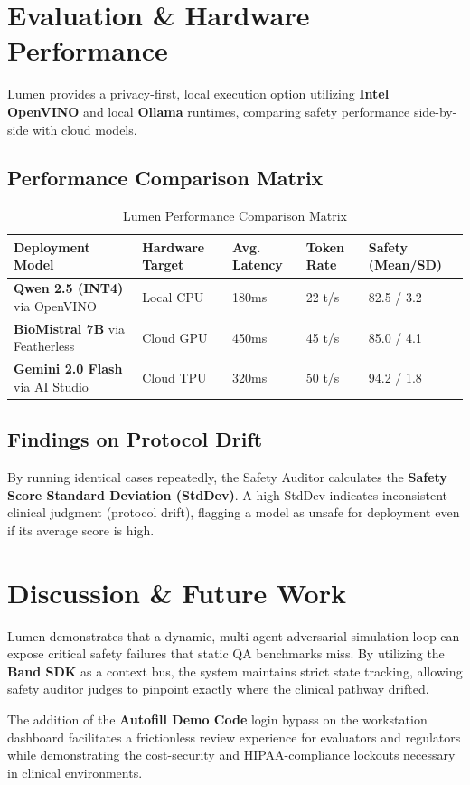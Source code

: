 \documentclass[10pt,journal,compsoc]{IEEEtran}
\begin{document}
\section{Evaluation \& Hardware Performance}
Lumen provides a privacy-first, local execution option utilizing \textbf{Intel OpenVINO} and local \textbf{Ollama} runtimes, comparing safety performance side-by-side with cloud models.

\subsection{Performance Comparison Matrix}
\begin{table}[h]
\centering
\caption{Lumen Performance Comparison Matrix}
\begin{tabular}{p{2.2cm}p{1.5cm}p{1.2cm}p{1.2cm}p{1cm}}
\toprule
Deployment Model & Hardware Target & Avg. Latency & Token Rate & Safety (Mean/SD) \\
\midrule
\textbf{Qwen 2.5 (INT4)} via OpenVINO & Local CPU & 180ms & 22 t/s & 82.5 / 3.2 \\
\textbf{BioMistral 7B} via Featherless & Cloud GPU & 450ms & 45 t/s & 85.0 / 4.1 \\
\textbf{Gemini 2.0 Flash} via AI Studio & Cloud TPU & 320ms & 50 t/s & 94.2 / 1.8 \\
\bottomrule
\end{tabular}
\end{table}

\subsection{Findings on Protocol Drift}
By running identical cases repeatedly, the Safety Auditor calculates the \textbf{Safety Score Standard Deviation (StdDev)}. A high StdDev indicates inconsistent clinical judgment (protocol drift), flagging a model as unsafe for deployment even if its average score is high.

\section{Discussion \& Future Work}
Lumen demonstrates that a dynamic, multi-agent adversarial simulation loop can expose critical safety failures that static QA benchmarks miss. By utilizing the \textbf{Band SDK} as a context bus, the system maintains strict state tracking, allowing safety auditor judges to pinpoint exactly where the clinical pathway drifted.

The addition of the \textbf{Autofill Demo Code} login bypass on the workstation dashboard facilitates a frictionless review experience for evaluators and regulators while demonstrating the cost-security and HIPAA-compliance lockouts necessary in clinical environments.
\end{document}
